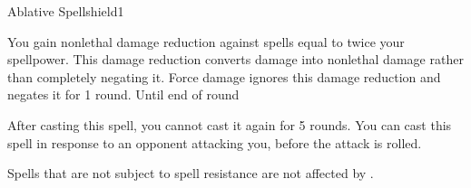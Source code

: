 \begin{spellsection}{Ablative Spellshield}{1}

    \begin{spellheader}
    \end{spellheader}
    \begin{spellcontent}
        \begin{spelltargetinginfo}
        \end{spelltargetinginfo}
        \begin{spelleffects}
            \spelleffect You gain nonlethal damage reduction against spells equal to twice your spellpower. This damage reduction converts damage into nonlethal damage rather than completely negating it. Force damage ignores this damage reduction and negates it for 1 round.
            \spelldur Until end of round
        \end{spelleffects}
    \end{spellcontent}
    \begin{spellfooter}
        \spellnotes After casting this spell, you cannot cast it again for 5 rounds. You can cast this spell in response to an opponent attacking you, before the attack is rolled.

        Spells that are not subject to spell resistance are not affected by .
        \miscastexplode
    \end{spellfooter}
\end{spellsection}

